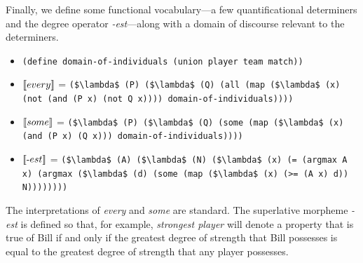 \documentclass[12pt]{article}
\newcommand{\llbracket}{\ensuremath{\left [\!\left [}}%
\newcommand{\rrbracket}{\ensuremath{\right ]\!\right ]}}
\providecommand{\sv}[1]{\ensuremath{\llbracket #1 \rrbracket}}
\begin{document}
Finally, we define some functional vocabulary---a few quantificational determiners and the degree operator \emph{-est}---along with a domain of discourse relevant to the determiners.
\begin{itemize}
\item \lstinline{(define domain-of-individuals (union player team match))}
\item \sv{every} = \lstinline[mathescape]{($\lambda$ (P) ($\lambda$ (Q) (all (map ($\lambda$ (x) (not (and (P x) (not Q x)))) domain-of-individuals))))}
\item \sv{some} = \lstinline[mathescape]{($\lambda$ (P) ($\lambda$ (Q) (some (map ($\lambda$ (x) (and (P x) (Q x))) domain-of-individuals))))}
\item \sv{\text{-}est} = \lstinline[mathescape]{($\lambda$ (A) ($\lambda$ (N) ($\lambda$ (x) (= (argmax A x) (argmax ($\lambda$ (d) (some (map ($\lambda$ (x) (>= (A x) d)) N))))))))}
\end{itemize}
The interpretations of \emph{every} and \emph{some} are standard. 
The superlative morpheme \emph{-est} is defined so that, for example, \emph{strongest player} will denote a property that is true of Bill if and only if the greatest degree of strength that Bill possesses is equal to the greatest degree of strength that any player possesses.
\end{document}
